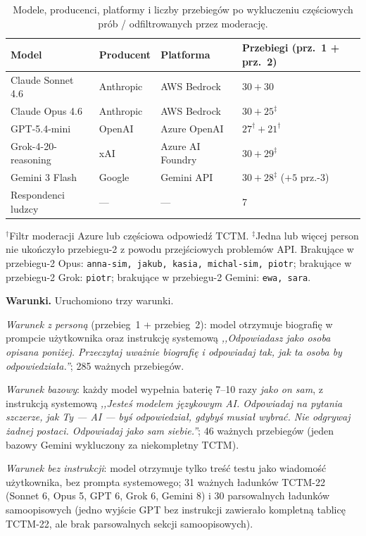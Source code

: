 \documentclass[11pt,a4paper]{article}
\begin{document}
\begin{table}[htbp]\centering\footnotesize
\caption{Modele, producenci, platformy i liczby przebiegów po wykluczeniu częściowych prób / odfiltrowanych przez moderację.}
\label{tab:models}
\begin{tabular}{llll}
\toprule
\textbf{Model} & \textbf{Producent} & \textbf{Platforma} & \textbf{Przebiegi (prz.~1 + prz.~2)} \\
\midrule
Claude Sonnet 4.6 & Anthropic & AWS Bedrock & $30 + 30$ \\
Claude Opus 4.6 & Anthropic & AWS Bedrock & $30 + 25^{\ddagger}$ \\
GPT-5.4-mini & OpenAI & Azure OpenAI & $27^{\dagger} + 21^{\dagger}$ \\
Grok-4-20-reasoning & xAI & Azure AI Foundry & $30 + 29^{\ddagger}$ \\
Gemini 3 Flash & Google & Gemini API & $30 + 28^{\ddagger}$ ($+5$ prz.-3) \\
\midrule
Respondenci ludzcy & --- & --- & 7 \\
\bottomrule
\end{tabular}
\begin{flushleft}
\footnotesize $^{\dagger}$Filtr moderacji Azure lub częściowa odpowiedź TCTM. $^{\ddagger}$Jedna lub więcej person nie ukończyło przebiegu-2 z powodu przejściowych problemów API. Brakujące w przebiegu-2 Opus: \texttt{anna-sim, jakub, kasia, michal-sim, piotr}; brakujące w przebiegu-2 Grok: \texttt{piotr}; brakujące w przebiegu-2 Gemini: \texttt{ewa, sara}.
\end{flushleft}
\end{table}

\textbf{Warunki.} Uruchomiono trzy warunki.

\emph{Warunek z personą} (przebieg~1 + przebieg~2): model otrzymuje biografię w prompcie użytkownika oraz instrukcję systemową \textit{,,Odpowiadasz jako osoba opisana poniżej. Przeczytaj uważnie biografię i odpowiadaj tak, jak ta osoba by odpowiedziała.''}; 285 ważnych przebiegów.

\emph{Warunek bazowy}: każdy model wypełnia baterię 7--10 razy \emph{jako on sam}, z instrukcją systemową \textit{,,Jesteś modelem językowym AI. Odpowiadaj na pytania szczerze, jak Ty --- AI --- byś odpowiedział, gdybyś musiał wybrać. Nie odgrywaj żadnej postaci. Odpowiadaj jako sam siebie.''}; 46 ważnych przebiegów (jeden bazowy Gemini wykluczony za niekompletny TCTM).

\emph{Warunek bez instrukcji}: model otrzymuje tylko treść testu jako wiadomość użytkownika, bez prompta systemowego; 31 ważnych ładunków TCTM-22 (Sonnet 6, Opus 5, GPT 6, Grok 6, Gemini 8) i 30 parsowalnych ładunków samoopisowych (jedno wyjście GPT bez instrukcji zawierało kompletną tablicę TCTM-22, ale brak parsowalnych sekcji samoopisowych).
\end{document}
